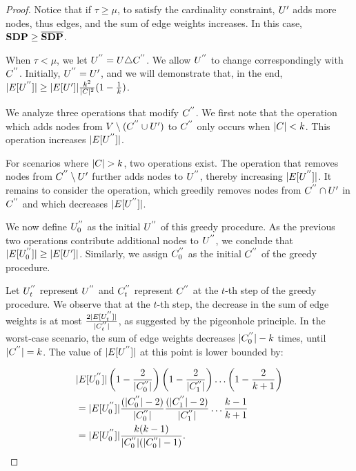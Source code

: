 \begin{proof}
Notice that if $\tau \geq \mu$, to satisfy the cardinality constraint, $U'$ adds more nodes, thus edges, and the sum of edge weights increases. In this case, $\mathbf{SDP} \geq \overline{\mathbf{SDP}}$.

When $\tau < \mu$, we let $U^{''} = U \triangle C^{''}$. We allow $U^{''}$ to change correspondingly with $C^{''}$. Initially, $U^{''} = U'$, and we will demonstrate that, in the end, $\lvert E[U^{''}]\rvert \geq \lvert E[U']\rvert\frac{k^2}{\lvert C\rvert^2}(1 - \frac{1}{k})$.

We analyze three operations that modify $C^{''}$. We first note that the
operation which adds nodes from $V \setminus (C^{''} \cup U')$ to $C^{''}$ only occurs when $\lvert C\rvert < k$. This operation increases $\lvert E[U^{''}]\rvert$.

For scenarios where $\lvert C\rvert>k$, two operations exist. The operation
that removes nodes from $C^{''} \setminus U'$ further adds nodes to $U^{''}$, thereby increasing $\lvert E[U^{''}]\rvert$.
It remains to consider the operation, which greedily removes nodes from
$C^{''} \cap U'$ in $C^{''}$ and which decreases
$\lvert E[U^{''}]\rvert$.

We now define $U^{''}_0$ as the initial $U^{''}$ of this greedy procedure. As the previous two operations contribute additional nodes to $U^{''}$, we conclude that $\lvert E[U^{''}_{0}]\rvert \geq \lvert E[U']\rvert$. Similarly, we assign $C^{''}_0$ as the initial $C^{''}$ of the greedy procedure.

Let $U^{''}_t$ represent $U^{''}$ and $C^{''}_t$ represent $C^{''}$ at the $t$-th step of the greedy procedure. We observe that at the $t$-th step, the decrease in the sum of edge weights is at most $\frac{2\lvert E[U^{''}_t]\rvert}{\lvert C^{''}_t\rvert}$, as suggested by the pigeonhole principle. In the worst-case scenario, the sum of edge weights decreases $\lvert C^{''}_0\rvert - k$ times, until $\lvert C^{''}\rvert = k$. The value of $\lvert E[U^{''}]\rvert$ at this point is lower bounded by:

\begin{displaymath}
\begin{split}
&\lvert E[U^{''}_{0}]\rvert \left(1 - \frac{2}{\lvert C^{''}_0\rvert}\right)\left(1 - \frac{2}{\lvert C^{''}_1\rvert}\right) \ldots \left(1 - \frac{2}{k+1}\right) \\
&= \lvert E[U^{''}_{0}]\rvert \frac{(\lvert C^{''}_0\rvert -2)}{\lvert C^{''}_0\rvert} \frac{(\lvert C^{''}_1\rvert -2)}{\lvert C^{''}_1\rvert}\ldots \frac{k-1}{k+1} \\
&= \lvert E[U^{''}_{0}]\rvert \frac{k(k-1)}{\lvert C^{''}_0\rvert(\lvert C^{''}_0\rvert -1)}.
\end{split}
\end{displaymath}


\end{proof}
